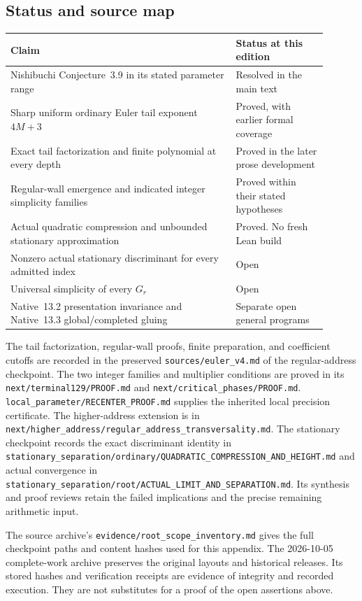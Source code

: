 \subsection{Status and source map}
\label{app:root:evidence}

\begin{center}
\begin{tabular}{>{\raggedright\arraybackslash}p{0.64\linewidth}>{\raggedright\arraybackslash}p{0.26\linewidth}}
\toprule
Claim & Status at this edition\\
\midrule
Nishibuchi Conjecture~3.9 in its stated parameter range
 & Resolved in the main text\\
Sharp uniform ordinary Euler tail exponent $4M+3$
 & Proved, with earlier formal coverage\\
Exact tail factorization and finite polynomial at every depth
 & Proved in the later prose development\\
Regular-wall emergence and indicated integer simplicity families
 & Proved within their stated hypotheses\\
Actual quadratic compression and unbounded stationary approximation
 & Proved. No fresh Lean build\\
Nonzero actual stationary discriminant for every admitted index
 & Open\\
Universal simplicity of every $G_r$
 & Open\\
Native~13.2 presentation invariance and Native~13.3 global/completed gluing
 & Separate open general programs\\
\bottomrule
\end{tabular}
\end{center}

The tail factorization, regular-wall proofs, finite preparation, and
coefficient cutoffs are recorded in the preserved
\nolinkurl{sources/euler_v4.md} of the regular-address checkpoint.
The two integer families and multiplier conditions are proved in its
\nolinkurl{next/terminal129/PROOF.md} and
\nolinkurl{next/critical_phases/PROOF.md}.
\nolinkurl{local_parameter/RECENTER_PROOF.md} supplies the inherited
local precision certificate. The higher-address extension is in
\nolinkurl{next/higher_address/regular_address_transversality.md}.
The stationary checkpoint records the exact discriminant identity in
\nolinkurl{stationary_separation/ordinary/QUADRATIC_COMPRESSION_AND_HEIGHT.md}
and actual convergence in
\nolinkurl{stationary_separation/root/ACTUAL_LIMIT_AND_SEPARATION.md}.
Its synthesis and proof reviews retain the failed
implications and the precise remaining arithmetic input.

The source archive's \nolinkurl{evidence/root_scope_inventory.md} gives
the full checkpoint paths and content hashes used for this appendix.
The 2026-10-05 complete-work archive preserves the original layouts and
historical releases. Its stored hashes and verification receipts are
evidence of integrity and recorded execution. They are not substitutes
for a proof of the open assertions above.
